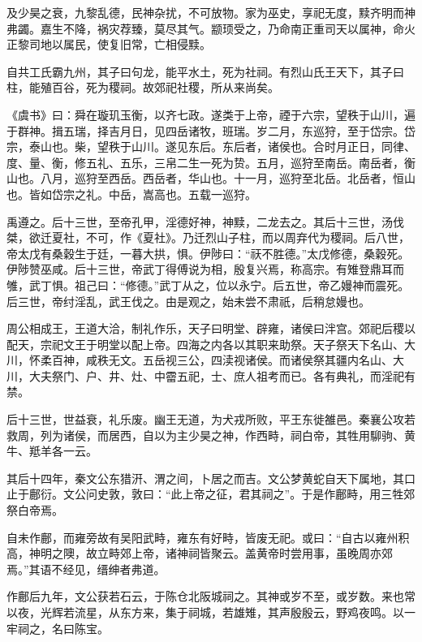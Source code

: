 \documentclass[12pt,UTF8]{ctexbook}
\begin{document}
及少昊之衰，九黎乱德，民神杂扰，不可放物。家为巫史，享祀无度，黩齐明而神弗蠲。嘉生不降，祸灾荐臻，莫尽其气。颛顼受之，乃命南正重司天以属神，命火正黎司地以属民，使复旧常，亡相侵黩。



自共工氏霸九州，其子曰句龙，能平水土，死为社祠。有烈山氏王天下，其子曰柱，能殖百谷，死为稷祠。故郊祀社稷，所从来尚矣。



《虞书》曰：舜在璇玑玉衡，以齐七政。遂类于上帝，禋于六宗，望秩于山川，遍于群神。揖五瑞，择吉月日，见四岳诸牧，班瑞。岁二月，东巡狩，至于岱宗。岱宗，泰山也。柴，望秩于山川。遂见东后。东后者，诸侯也。合时月正日，同律、度、量、衡，修五礼、五乐，三帛二生一死为贽。五月，巡狩至南岳。南岳者，衡山也。八月，巡狩至西岳。西岳者，华山也。十一月，巡狩至北岳。北岳者，恒山也。皆如岱宗之礼。中岳，嵩高也。五载一巡狩。



禹遵之。后十三世，至帝孔甲，淫德好神，神黩，二龙去之。其后十三世，汤伐桀，欲迁夏社，不可，作《夏社》。乃迁烈山子柱，而以周弃代为稷祠。后八世，帝太戊有桑穀生于廷，一暮大拱，惧。伊陟曰：“祆不胜德。”太戊修德，桑穀死。伊陟赞巫咸。后十三世，帝武丁得傅说为相，殷复兴焉，称高宗。有雉登鼎耳而雊，武丁惧。祖己曰：“修德。”武丁从之，位以永宁。后五世，帝乙嫚神而震死。后三世，帝纣淫乱，武王伐之。由是观之，始未尝不肃祇，后稍怠嫚也。



周公相成王，王道大洽，制礼作乐，天子曰明堂、辟雍，诸侯曰泮宫。郊祀后稷以配天，宗祀文王于明堂以配上帝。四海之内各以其职来助祭。天子祭天下名山、大川，怀柔百神，咸秩无文。五岳视三公，四渎视诸侯。而诸侯祭其疆内名山、大川，大夫祭门、户、井、灶、中霤五祀，士、庶人祖考而已。各有典礼，而淫祀有禁。



后十三世，世益衰，礼乐废。幽王无道，为犬戎所败，平王东徙雒邑。秦襄公攻若救周，列为诸侯，而居西，自以为主少昊之神，作西畤，祠白帝，其牲用駠驹、黄牛、羝羊各一云。



其后十四年，秦文公东猎汧、渭之间，卜居之而吉。文公梦黄蛇自天下属地，其口止于鄜衍。文公问史敦，敦曰：“此上帝之征，君其祠之”。于是作鄜畤，用三牲郊祭白帝焉。



自未作鄜，而雍旁故有吴阳武畤，雍东有好畤，皆废无祀。或曰：“自古以雍州积高，神明之隩，故立畤郊上帝，诸神祠皆聚云。盖黄帝时尝用事，虽晚周亦郊焉。”其语不经见，缙绅者弗道。



作鄜后九年，文公获若石云，于陈仓北阪城祠之。其神或岁不至，或岁数。来也常以夜，光辉若流星，从东方来，集于祠城，若雄雉，其声殷殷云，野鸡夜鸣。以一牢祠之，名曰陈宝。
\end{document}
